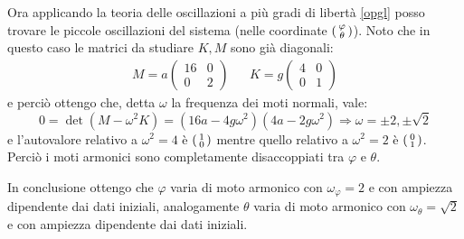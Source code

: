 \documentclass[../main.tex]{subfiles}
\begin{document}
Ora applicando la teoria delle oscillazioni a più gradi di libertà \cref{opgl} posso trovare le piccole oscillazioni del sistema (nelle coordinate $\begin{psmallmatrix}\varphi \\ \theta\end{psmallmatrix}$).
Noto che in questo caso le matrici da studiare $K,M$ sono già diagonali:
\begin{align*}
	M=a\begin{pmatrix}
		16 & 0 \\
		0  & 2
	\end{pmatrix}
	& &
	K=g\begin{pmatrix}
		4 & 0 \\
		0 & 1
	\end{pmatrix}
\end{align*}
e perciò ottengo che, detta $\omega$ la frequenza dei moti normali, vale:
\begin{equation*}
	0=\det \left ( M-\omega^2K \right )=(16a-4g\omega^2)(4a-2g\omega^2) \Rightarrow \omega=\pm2,\pm\sqrt2
\end{equation*}
e l'autovalore relativo a $\omega^2=4$ è $\begin{psmallmatrix}1 \\ 0\end{psmallmatrix}$ mentre quello relativo a $\omega^2=2$ è $\begin{psmallmatrix}0 \\ 1\end{psmallmatrix}$. Perciò i moti armonici sono completamente disaccoppiati tra $\varphi$ e $\theta$.

In conclusione ottengo che $\varphi$ varia di moto armonico con $\omega_\varphi=2$ e con ampiezza dipendente dai dati iniziali, analogamente $\theta$ varia di moto armonico con $\omega_\theta=\sqrt2$ e con ampiezza dipendente dai dati iniziali.
\end{document}
